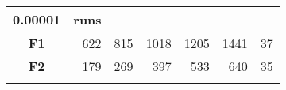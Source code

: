 \documentclass[12pt,a4paper]{article}
\begin{document}
\begin{longtable}[c]{@{}crrrrrr@{}}
\begin{minipage}[b]{0.11\columnwidth}
0.00001
\strut\end{minipage} &
\begin{minipage}[b]{0.07\columnwidth}\raggedleft\strut
runs
\strut\end{minipage}\tabularnewline
\midrule
\endhead
\begin{minipage}[t]{0.11\columnwidth}\centering\strut
\textbf{F1}
\strut\end{minipage} &
\begin{minipage}[t]{0.08\columnwidth}\raggedleft\strut
622
\strut\end{minipage} &
\begin{minipage}[t]{0.08\columnwidth}\raggedleft\strut
815
\strut\end{minipage} &
\begin{minipage}[t]{0.09\columnwidth}\raggedleft\strut
1018
\strut\end{minipage} &
\begin{minipage}[t]{0.10\columnwidth}\raggedleft\strut
1205
\strut\end{minipage} &
\begin{minipage}[t]{0.11\columnwidth}\raggedleft\strut
1441
\strut\end{minipage} &
\begin{minipage}[t]{0.07\columnwidth}\raggedleft\strut
37
\strut\end{minipage}\tabularnewline
\begin{minipage}[t]{0.11\columnwidth}\centering\strut
\textbf{F2}
\strut\end{minipage} &
\begin{minipage}[t]{0.08\columnwidth}\raggedleft\strut
179
\strut\end{minipage} &
\begin{minipage}[t]{0.08\columnwidth}\raggedleft\strut
269
\strut\end{minipage} &
\begin{minipage}[t]{0.09\columnwidth}\raggedleft\strut
397
\strut\end{minipage} &
\begin{minipage}[t]{0.10\columnwidth}\raggedleft\strut
533
\strut\end{minipage} &
\begin{minipage}[t]{0.11\columnwidth}\raggedleft\strut
640
\strut\end{minipage} &
\begin{minipage}[t]{0.07\columnwidth}\raggedleft\strut
35
\strut\end{minipage}\tabularnewline
\begin{minipage}[t]{0.11\columnwidth}\centering\strut

\end{minipage}
\end{longtable}
\end{document}
